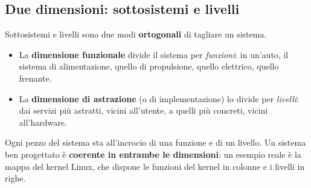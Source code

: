 \subsection{Due dimensioni: sottosistemi e livelli}

Sottosistemi e livelli sono due modi \textbf{ortogonali} di tagliare un sistema.
\begin{itemize}
  \item La \textbf{dimensione funzionale} divide il sistema per \textit{funzioni}: in un'auto, il sistema di alimentazione,
        quello di propulsione, quello elettrico, quello frenante.
  \item La \textbf{dimensione di astrazione} (o di implementazione) lo divide per \textit{livelli}: dai servizi più
        astratti, vicini all'utente, a quelli più concreti, vicini all'hardware.
\end{itemize}
Ogni pezzo del sistema sta all'incrocio di una funzione e di un livello. Un sistema ben progettato è \textbf{coerente in
entrambe le dimensioni}: un esempio reale è la mappa del kernel Linux, che dispone le funzioni del kernel in colonne e i
livelli in righe.

